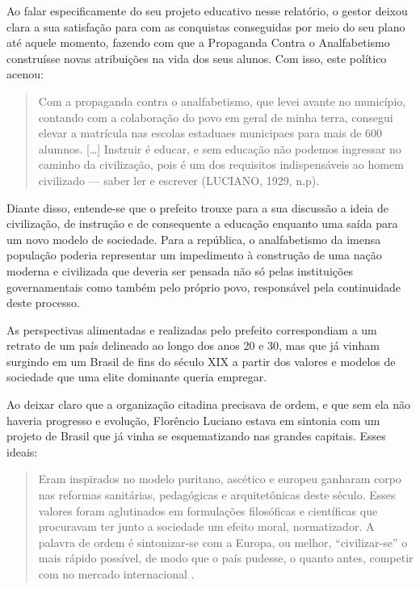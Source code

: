 \begin{refsection}
Ao falar especificamente do seu projeto educativo nesse relatório, o gestor deixou clara a sua satisfação para com as conquistas conseguidas por meio do seu plano até aquele momento, fazendo com que a Propaganda Contra o Analfabetismo construísse novas atribuições na vida dos seus alunos. Com isso, este político acenou:

\begin{quotation}
    Com a propaganda contra o analfabetismo, que levei avante no município, contando com a colaboração do povo em geral de minha terra, consegui elevar a matrícula nas escolas estaduaes municipaes para mais de 600 alumnos. [\dots] Instruir é educar, e sem educação não podemos ingressar no caminho da civilização, pois é um dos requisitos indispensáveis ao homem civilizado --- saber ler e escrever (LUCIANO, 1929, n.p).
\end{quotation}

Diante disso, entende-se que o prefeito trouxe para a sua discussão a ideia de civilização, de instrução e de consequente a educação enquanto uma saída para um novo modelo de sociedade. Para a república, o analfabetismo da imensa população poderia representar um impedimento à construção de uma nação moderna e civilizada que deveria ser pensada não só pelas instituições governamentais como também pelo próprio povo, responsável pela continuidade deste processo.  

As perspectivas alimentadas e realizadas pelo prefeito correspondiam a um retrato de um país delineado ao longo dos anos 20 e 30, mas que já vinham surgindo em um Brasil de fins do século XIX a partir dos valores e modelos de sociedade que uma elite dominante queria empregar. 

Ao deixar claro que a organização citadina precisava de ordem, e que sem ela não haveria progresso e evolução, Florêncio Luciano estava em sintonia com um projeto de Brasil que já vinha se esquematizando nas grandes capitais. Esses ideais:

\begin{quotation}
    Eram inspirados no modelo puritano, ascético e europeu ganharam corpo nas reformas sanitárias, pedagógicas e arquitetônicas deste século. Esses valores foram aglutinados em formulações filosóficas e científicas que procuravam ter junto a sociedade um efeito moral, normatizador. A palavra de ordem é sintonizar-se com a Europa, ou melhor, ``civilizar-se'' o mais rápido possível, de modo que o país pudesse, o quanto antes, competir com no mercado internacional \cite[p.~26]{HerschmannAndPereira1994Invencao}.
\end{quotation}


\end{refsection}
